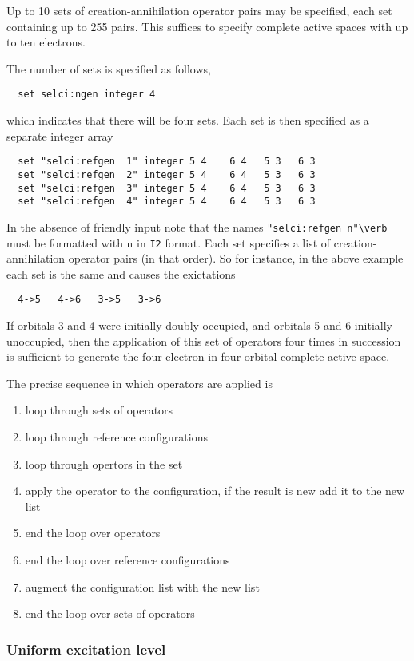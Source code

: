 Up to 10 sets of creation-annihilation operator pairs may be
specified, each set containing up to 255 pairs.  This suffices to
specify complete active spaces with up to ten electrons.

The number of sets is specified as follows,
\begin{verbatim}
  set selci:ngen integer 4
\end{verbatim}
which indicates that there will be four sets.  Each set is then
specified as a separate integer array
\begin{verbatim}
  set "selci:refgen  1" integer 5 4    6 4   5 3   6 3  
  set "selci:refgen  2" integer 5 4    6 4   5 3   6 3  
  set "selci:refgen  3" integer 5 4    6 4   5 3   6 3  
  set "selci:refgen  4" integer 5 4    6 4   5 3   6 3  
\end{verbatim}
In the absence of friendly input note that the names
\verb+"selci:refgen n"\verb+ must be formatted with n in \verb+I2+
format. Each set specifies a list of creation-annihilation operator
pairs (in that order).  So for instance, in the above example each set
is the same and causes the exictations
\begin{verbatim}
  4->5   4->6   3->5   3->6
\end{verbatim}
If orbitals 3 and 4 were initially doubly occupied, and orbitals 5 and
6 initially unoccupied, then the application of this set of operators
four times in succession is sufficient to generate the four electron
in four orbital complete active space.

The precise sequence in which operators are applied is
\begin{enumerate}
\item loop through sets of operators
\item loop through reference configurations
\item loop through opertors in the set
\item apply the operator to the configuration, if the result is new add it
  to the new list
\item end the loop over operators
\item end the loop over reference configurations
\item augment the configuration list with the new list
\item end the loop over sets of operators
\end{enumerate}

\subsubsection{Uniform excitation level}

